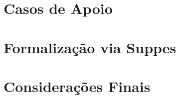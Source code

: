 \documentclass[12pt,a4paper]{article}
\theoremstyle{definition}
\theoremstyle{plain}
\theoremstyle{remark}
\begin{document}
	
	\section{Casos de Apoio}
	
	
	\section{Formalização via Suppes}
	
	
	\section{Considerações Finais}
	
	
	
	
	
\end{document}
